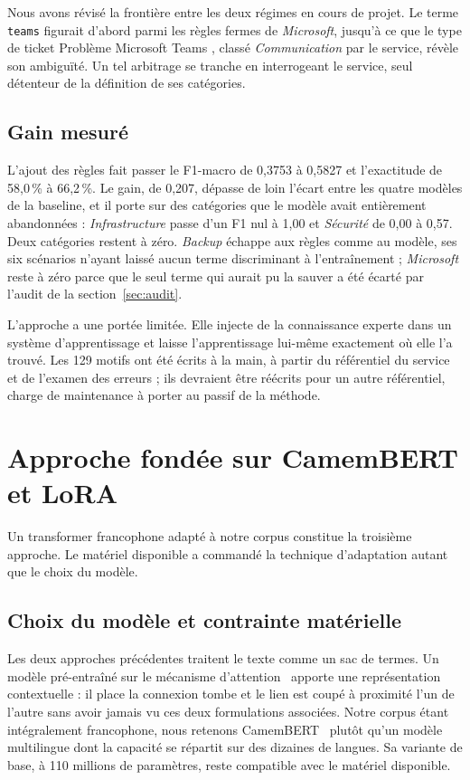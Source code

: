 Nous avons révisé la frontière entre les deux régimes en cours de projet. Le terme \texttt{teams}
figurait d'abord parmi les règles fermes de \emph{Microsoft}, jusqu'à ce que le type de ticket
\og Problème Microsoft Teams \fg{}, classé \emph{Communication} par le service, révèle son
ambiguïté. Un tel arbitrage se tranche en interrogeant le service, seul détenteur de la définition
de ses catégories.

\subsection{Gain mesuré}

L'ajout des règles fait passer le F1-macro de 0,3753 à 0,5827 et l'exactitude de 58,0\,\% à
66,2\,\%. Le gain, de 0,207, dépasse de loin l'écart entre les quatre modèles de la baseline, et il
porte sur des catégories que le modèle avait entièrement abandonnées : \emph{Infrastructure} passe
d'un F1 nul à 1,00 et \emph{Sécurité} de 0,00 à 0,57. Deux catégories restent à zéro.
\emph{Backup} échappe aux règles comme au modèle, ses six scénarios n'ayant laissé aucun terme
discriminant à l'entraînement ; \emph{Microsoft} reste à zéro parce que le seul terme qui aurait pu
la sauver a été écarté par l'audit de la section~\ref{sec:audit}.

L'approche a une portée limitée. Elle injecte de la connaissance experte dans un système
d'apprentissage et laisse l'apprentissage lui-même exactement où elle l'a trouvé. Les 129 motifs ont
été écrits à la main, à partir du référentiel du service et de l'examen des erreurs ; ils devraient
être réécrits pour un autre référentiel, charge de maintenance à porter au passif de la méthode.

\section{Approche fondée sur CamemBERT et LoRA}

Un transformer francophone adapté à notre corpus constitue la troisième approche. Le
matériel disponible a commandé la technique d'adaptation autant que le choix du modèle.

\subsection{Choix du modèle et contrainte matérielle}

Les deux approches précédentes traitent le texte comme un sac de termes. Un modèle pré-entraîné sur
le mécanisme d'attention~\cite{vaswani2017,devlin2019} apporte une représentation contextuelle : il
place \og la connexion tombe \fg{} et \og le lien est coupé \fg{} à proximité l'un de l'autre sans
avoir jamais vu ces deux formulations associées. Notre corpus étant intégralement francophone, nous
retenons CamemBERT~\cite{martin2020} plutôt qu'un modèle multilingue dont la capacité se répartit
sur des dizaines de langues. Sa variante de base, à 110 millions de paramètres, reste compatible
avec le matériel disponible.

